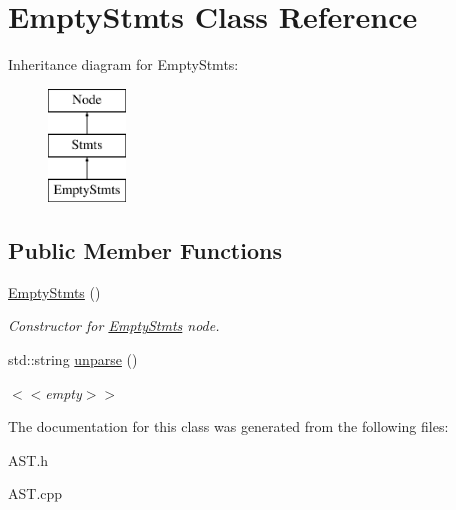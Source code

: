 \hypertarget{classEmptyStmts}{\section{Empty\-Stmts Class Reference}
\label{classEmptyStmts}
}
Inheritance diagram for Empty\-Stmts\-:\begin{figure}[H]
\begin{center}
\leavevmode
\includegraphics[height=3.000000cm]{classEmptyStmts}
\end{center}
\end{figure}
\subsection*{Public Member Functions}
\begin{DoxyCompactItemize}
\item 
\hypertarget{classEmptyStmts_aec1fdeb62d294b8fedf55ff234fcacf5}{\hyperlink{classEmptyStmts_aec1fdeb62d294b8fedf55ff234fcacf5}{Empty\-Stmts} ()}\label{classEmptyStmts_aec1fdeb62d294b8fedf55ff234fcacf5}

\begin{DoxyCompactList}\small\item\em Constructor for \hyperlink{classEmptyStmts}{Empty\-Stmts} node. \end{DoxyCompactList}\item 
\hypertarget{classEmptyStmts_a127064ef5c59227fc8452b31c65eb905}{std\-::string \hyperlink{classEmptyStmts_a127064ef5c59227fc8452b31c65eb905}{unparse} ()}\label{classEmptyStmts_a127064ef5c59227fc8452b31c65eb905}

\begin{DoxyCompactList}\small\item\em $<$$<$empty$>$$>$ \end{DoxyCompactList}\end{DoxyCompactItemize}


The documentation for this class was generated from the following files\-:\begin{DoxyCompactItemize}
\item 
A\-S\-T.\-h\item 
A\-S\-T.\-cpp\end{DoxyCompactItemize}
